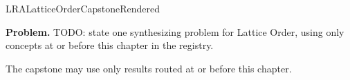 \ifcsname LRALatticeOrderCapstoneRendered\endcsname
\else
\expandafter\gdef\csname LRALatticeOrderCapstoneRendered\endcsname{}

\newpage
{}
\label{cap:lattice-order}

\begin{tcolorbox}[
  colback=gray!6,
  colframe=gray!40,
  arc=2pt,
  left=8pt, right=8pt, top=6pt, bottom=6pt,
  title={\small\textbf{Capstone Problem}},
  fonttitle=\small\bfseries
]
\textbf{Problem.}
TODO: state one synthesizing problem for Lattice Order, using only concepts at or
before this chapter in the registry.
\end{tcolorbox}

\begin{remark*}
The capstone may use only results routed at or before this chapter.
\end{remark*}

\clearpage
\fi
